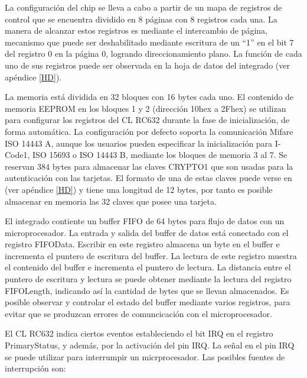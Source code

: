 \bigskip
{}\label{Registros}

La configuración del chip se lleva a cabo a partir de un mapa de registros de control que se encuentra dividido en 8 páginas con 8 registros cada una. La manera de alcanzar estos registros es mediante el intercambio de página, mecanismo que puede ser deshabilitado mediante escritura de un “1” en el bit 7 del registro 0 en la página 0, logrando direccionamiento plano. La función de cada uno de sus registros puede ser observada en la hoja de datos del integrado \cite{RC632} (ver apéndice \ref{HD}).

\bigskip
{}

La memoria está dividida en 32 bloques con 16 bytes cada uno.
El contenido de memoria EEPROM en los bloques 1 y 2 (dirección 10hex a 2Fhex) se utilizan para configurar los registros del CL RC632 durante la fase de inicialización, de forma automática.
La configuración por defecto soporta la comunicación Mifare ISO 14443 A, aunque los usuarios pueden especificar la inicialización para I-Code1, ISO 15693 o ISO 14443 B, mediante los bloques de memoria 3 al 7.
Se reservan 384 bytes para almacenar las claves CRYPTO1 que son usadas para la autenticación con las tarjetas. El formato de una de estas claves puede verse en \cite{RC632} (ver apéndice \ref{HD}) y tiene una longitud de 12 bytes, por tanto es posible almacenar en memoria las 32 claves que posee una tarjeta.

\bigskip
{}

El integrado contiente un buffer FIFO de 64 bytes para flujo de datos con un microprocesador.
La entrada y salida del buffer de datos está conectado con el registro FIFOData. Escribir en este registro almacena un byte en el buffer e incrementa el puntero de escritura del buffer. La lectura de este registro muestra el contenido del buffer e incrementa el puntero de lectura. La distancia entre el puntero de escritura y lectura se puede obtener mediante la lectura del registro FIFOLength, indicando así la cantidad de bytes que se llevan almacenados. Es posible observar y controlar el estado del buffer mediante varios registros, para evitar que se produzcan errores de comuncicación con el microprocesador.

\bigskip
{}

El CL RC632 indica ciertos eventos estableciendo el bit IRQ en el registro \\
PrimaryStatus, y además, por la activación del pin IRQ. La señal en el pin IRQ se puede utilizar para interrumpir un micrprocesador. 
Las posibles fuentes de interrupción son: 

